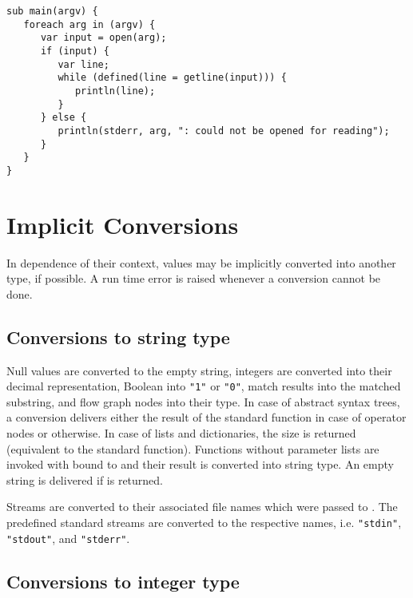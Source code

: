 \begin{lstlisting}
sub main(argv) {
   foreach arg in (argv) {
      var input = open(arg);
      if (input) {
         var line;
         while (defined(line = getline(input))) {
            println(line);
         }
      } else {
         println(stderr, arg, ": could not be opened for reading");
      }
   }
}
\end{lstlisting}

\section{Implicit Conversions}

In dependence of their context, values may be implicitly converted
into another type, if possible. A run time error is raised whenever
a conversion cannot be done.

\subsection{Conversions to string type}\label{functionconv}
\label{stringconv}

Null values are converted to the empty string,
integers are converted into their decimal representation,
Boolean into \lstinline!"1"! or \lstinline!"0"!,
match results into the matched substring, and
flow graph nodes into their type. In case of
abstract syntax trees, a conversion delivers either the result of
the standard function  in case of
operator nodes or  otherwise. In case
of lists and dictionaries, the size is returned (equivalent to the
 standard function). Functions without
parameter lists are invoked with
 bound to  and their result is converted
into string type. An empty string is delivered if  is
returned.

Streams are converted to their associated file names
which were passed to . The predefined
standard streams are converted to the respective names,
i.e. \lstinline!"stdin"!, \lstinline!"stdout"!, and
\lstinline!"stderr"!.

\subsection{Conversions to integer type}\label{intconv}

